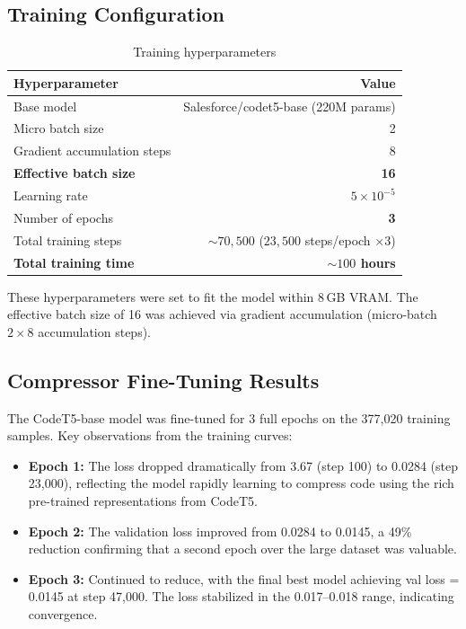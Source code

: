 \documentclass[11pt,a4paper]{article}
\begin{document}
\subsection{Training Configuration}

\begin{table}[H]
  \centering
  \caption{Training hyperparameters}
  \label{tab:hyperparams}
  \renewcommand{\arraystretch}{1.15}
  \begin{tabularx}{\textwidth}{X r}
    \toprule
    \textbf{Hyperparameter} & \textbf{Value} \\
    \midrule
    Base model                  & Salesforce/codet5-base (220M params) \\
    Micro batch size            & 2 \\
    Gradient accumulation steps & 8 \\
    \textbf{Effective batch size}        & \textbf{16} \\
    Learning rate               & $5 \times 10^{-5}$ \\
    Number of epochs            & \textbf{3} \\
    Total training steps        & ${\sim}70{,}500$ ($23{,}500$ steps/epoch $\times 3$) \\
    \textbf{Total training time}         & \textbf{${\sim}100$ hours} \\
    \bottomrule
  \end{tabularx}
\end{table}

These hyperparameters were set to fit the model within 8\,GB VRAM. The effective batch size of 16 was achieved via gradient accumulation (micro-batch $2 \times 8$ accumulation steps).

\subsection{Compressor Fine-Tuning Results}

The CodeT5-base model was fine-tuned for 3 full epochs on the 377,020 training samples. Key observations from the training curves:

\begin{itemize}[leftmargin=1.5em]
  \item \textbf{Epoch 1:} The loss dropped dramatically from 3.67 (step 100) to 0.0284 (step 23,000), reflecting the model rapidly learning to compress code using the rich pre-trained representations from CodeT5.
  \item \textbf{Epoch 2:} The validation loss improved from 0.0284 to 0.0145, a 49\% reduction confirming that a second epoch over the large dataset was valuable.
  \item \textbf{Epoch 3:} Continued to reduce, with the final best model achieving val loss = 0.0145 at step 47,000. The loss stabilized in the 0.017--0.018 range, indicating convergence.
\end{itemize}
\end{document}
